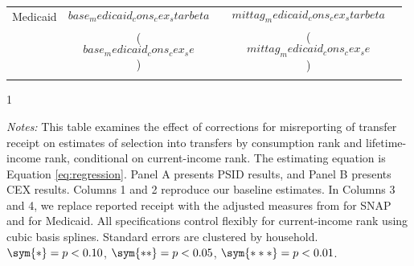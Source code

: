 \begin{table}[t!]
\begin{tabular*}{\textwidth}{@{\extracolsep{\fill}}lcccc}
Medicaid & $$base_medicaid_cons_cex_starbeta$$ &  & $$mittag_medicaid_cons_cex_starbeta$$ & \\
                  & ($$base_medicaid_cons_cex_se$$)       &    & ($$mittag_medicaid_cons_cex_se$$)       &   \\ \addlinespace \bottomrule                    \end{tabular*}
                \begin{spacing}{1}
                    \begin{tablenotes}
                          \item \footnotesize \textit{Notes:} This table examines the effect of corrections for misreporting of transfer receipt on estimates of selection into transfers by consumption rank and lifetime-income rank, conditional on current-income rank. The estimating equation is Equation \ref{eq:regression}. Panel A presents PSID results, and Panel B presents CEX results. Columns 1 and 2 reproduce our baseline estimates. In Columns 3 and 4, we replace reported receipt with the adjusted measures from  for SNAP and  for Medicaid. All specifications control flexibly for current-income rank using cubic basis splines.  Standard errors are clustered by household. $\sym{*} = p < 0.10$, $\sym{**} = p < 0.05$, $\sym{***} = p < 0.01$.
                          \end{tablenotes}
                           \end{spacing}
                    \end{table}                